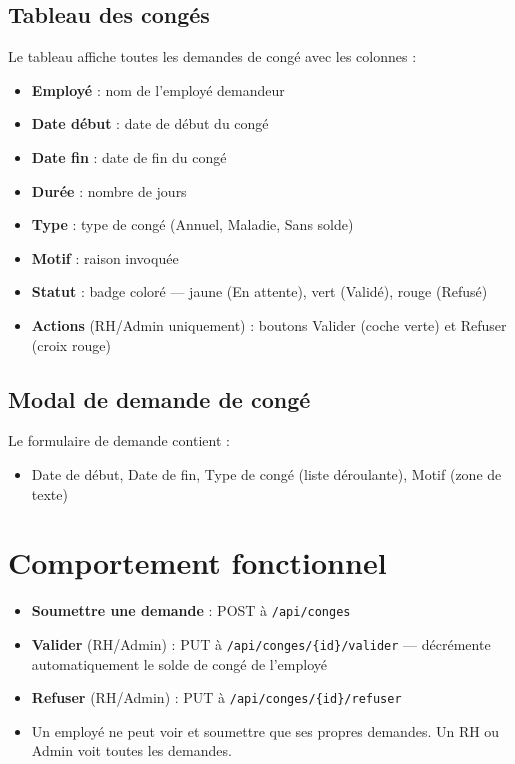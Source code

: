 \documentclass[12pt,a4paper]{report}
\begin{document}
\subsection{Tableau des congés}

Le tableau affiche toutes les demandes de congé avec les colonnes :
\begin{itemize}
    \item \textbf{Employé} : nom de l'employé demandeur
    \item \textbf{Date début} : date de début du congé
    \item \textbf{Date fin} : date de fin du congé
    \item \textbf{Durée} : nombre de jours
    \item \textbf{Type} : type de congé (Annuel, Maladie, Sans solde)
    \item \textbf{Motif} : raison invoquée
    \item \textbf{Statut} : badge coloré — jaune (En attente), vert (Validé), rouge (Refusé)
    \item \textbf{Actions} (RH/Admin uniquement) : boutons Valider (coche verte) et Refuser (croix rouge)
\end{itemize}

\subsection{Modal de demande de congé}

Le formulaire de demande contient :
\begin{itemize}
    \item Date de début, Date de fin, Type de congé (liste déroulante), Motif (zone de texte)
\end{itemize}

\section{Comportement fonctionnel}

\begin{itemize}
    \item \textbf{Soumettre une demande} : POST à \texttt{/api/conges}
    \item \textbf{Valider} (RH/Admin) : PUT à \texttt{/api/conges/\{id\}/valider} — décrémente automatiquement le solde de congé de l'employé
    \item \textbf{Refuser} (RH/Admin) : PUT à \texttt{/api/conges/\{id\}/refuser}
    \item Un employé ne peut voir et soumettre que ses propres demandes. Un RH ou Admin voit toutes les demandes.
\end{itemize}
\end{document}
